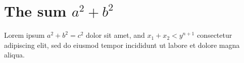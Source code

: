 \documentclass[11pt,oneside]{memoir}
\begin{document}
\section{The sum $a^2+b^2$}
Lorem ipsum $a^2+b^2=c^2$ dolor sit amet, and $x_1+x_2<y^{n+1}$ consectetur adipiscing elit, sed do eiusmod tempor incididunt ut labore et dolore magna aliqua.
\end{document}
